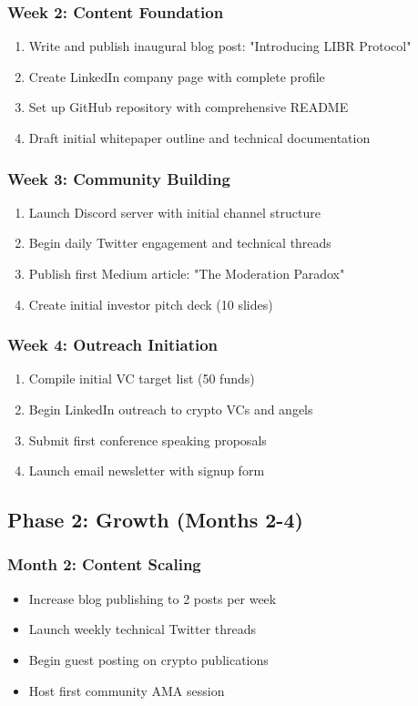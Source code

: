\documentclass[12pt,a4paper]{article}
\begin{document}
\begin{center}
\begin{itemize}
\begin{enumerate}
\subsubsection{Week 2: Content Foundation}
\begin{enumerate}
    \item Write and publish inaugural blog post: "Introducing LIBR Protocol"
    \item Create LinkedIn company page with complete profile
    \item Set up GitHub repository with comprehensive README
    \item Draft initial whitepaper outline and technical documentation
\end{enumerate}

\subsubsection{Week 3: Community Building}
\begin{enumerate}
    \item Launch Discord server with initial channel structure  
    \item Begin daily Twitter engagement and technical threads
    \item Publish first Medium article: "The Moderation Paradox"
    \item Create initial investor pitch deck (10 slides)
\end{enumerate}

\subsubsection{Week 4: Outreach Initiation}
\begin{enumerate}
    \item Compile initial VC target list (50 funds)
    \item Begin LinkedIn outreach to crypto VCs and angels
    \item Submit first conference speaking proposals
    \item Launch email newsletter with signup form
\end{enumerate}

\subsection{Phase 2: Growth (Months 2-4)}

\subsubsection{Month 2: Content Scaling}
\begin{itemize}
    \item Increase blog publishing to 2 posts per week
    \item Launch weekly technical Twitter threads
    \item Begin guest posting on crypto publications
    \item Host first community AMA session
\end{itemize}


\end{enumerate}
\end{itemize}
\end{center}
\end{document}
